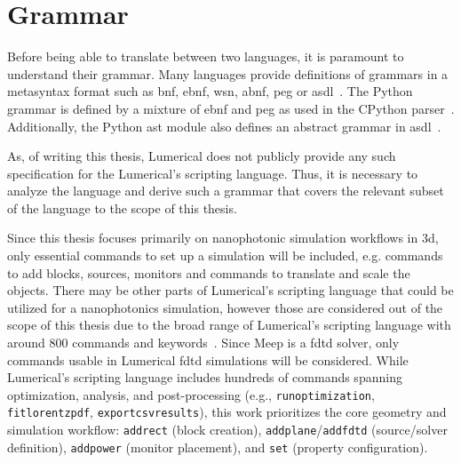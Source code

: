 


\section{Grammar}\label{grammar}
Before being able to translate between two languages, it is paramount to understand their grammar. Many languages provide definitions of grammars in a metasyntax format such as \gls{bnf}, \gls{ebnf}, \gls{wsn}, \gls{abnf}, \gls{peg} or \gls{asdl}~\cite{asdl}. The Python grammar is defined by a mixture of \gls{ebnf} and \gls{peg} as used in the CPython parser~\cite{python3grammar}. Additionally, the Python \gls{ast} module also defines an abstract grammar in \gls{asdl}~\cite{python_ast}.

As, of writing this thesis, Lumerical does not publicly provide any such specification for the Lumerical's scripting language. Thus, it is necessary to analyze the language and derive such a grammar that covers the relevant subset of the language to the scope of this thesis.

Since this thesis focuses primarily on nanophotonic simulation workflows in \gls{3d}, only essential commands to set up a simulation will be included, e.g. commands to add blocks, sources, monitors and commands to translate and scale the objects. There may be other parts of Lumerical's scripting language that could be utilized for a nanophotonics simulation, however those are considered out of the scope of this thesis due to the broad range of Lumerical's scripting language with around 800 commands and keywords~\cite{ansys_lsf_commands}. Since Meep is a \gls{fdtd} solver, only commands usable in Lumerical \gls{fdtd} simulations will be considered.
While Lumerical’s scripting language includes hundreds of commands spanning optimization, analysis, and post-processing (e.g., \texttt{runoptimization}, \texttt{fitlorentzpdf}, \texttt{exportcsvresults}), this work prioritizes the core geometry and simulation workflow: \texttt{addrect} (block creation), \texttt{addplane}/\texttt{addfdtd} (source/solver definition), \texttt{addpower} (monitor placement), and \texttt{set} (property configuration). 


